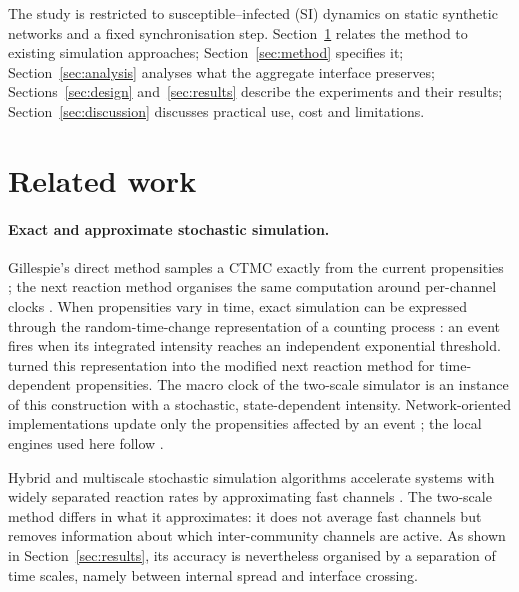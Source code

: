\documentclass[a4paper,fleqn]{cas-sc}
\begin{document}
The study is restricted to susceptible--infected (SI) dynamics on static synthetic networks and a fixed synchronisation step. Section~\ref{sec:related} relates the method to existing simulation approaches; Section~\ref{sec:method} specifies it; Section~\ref{sec:analysis} analyses what the aggregate interface preserves; Sections~\ref{sec:design} and~\ref{sec:results} describe the experiments and their results; Section~\ref{sec:discussion} discusses practical use, cost and limitations.

\section{Related work}
\label{sec:related}

\paragraph{Exact and approximate stochastic simulation.}
Gillespie's direct method samples a CTMC exactly from the current propensities \citep{gillespie1977exact}; the next reaction method organises the same computation around per-channel clocks \citep{gibson2000}. When propensities vary in time, exact simulation can be expressed through the random-time-change representation of a counting process \citep{ethier1986}: an event fires when its integrated intensity reaches an independent exponential threshold. \citet{anderson2007} turned this representation into the modified next reaction method for time-dependent propensities. The macro clock of the two-scale simulator is an instance of this construction with a stochastic, state-dependent intensity. Network-oriented implementations update only the propensities affected by an event \citep{vestergaard2015,kuryliak2025simulating}; the local engines used here follow \citet{kuryliak2025simulating}.

Hybrid and multiscale stochastic simulation algorithms accelerate systems with widely separated reaction rates by approximating fast channels \citep{haseltine2002,cao2005slow}. The two-scale method differs in what it approximates: it does not average fast channels but removes information about which inter-community channels are active. As shown in Section~\ref{sec:results}, its accuracy is nevertheless organised by a separation of time scales, namely between internal spread and interface crossing.
\end{document}
